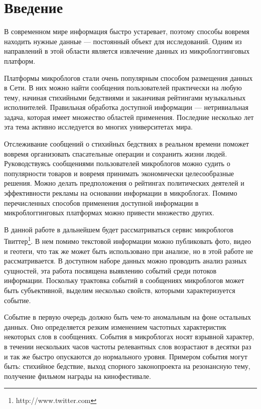 \documentclass[12pt, a4paper]{article}
\begin{document}
\tableofcontents\newpage

  \section{Введение}
  	В современном мире информация быстро устаревает, поэтому способы вовремя находить нужные данные --- постоянный объект для исследований. Одним из направлений в этой области является извлечение данных из микроблоггинговых платформ.
  	
  	Платформы микроблогов стали очень популярным способом размещения данных в Сети. В них можно найти сообщения пользователей практически на любую тему, начиная стихийными бедствиями и заканчивая рейтингами музыкальных исполнителей. Правильная обработка доступной информации --- нетривиальная задача, которая имеет множество областей применения. Последние несколько лет эта тема активно исследуется во многих университетах мира.
  	
	Отслеживание сообщений о стихийных бедствиях в реальном времени поможет вовремя организовать спасательные операции и сохранить жизни людей\cite{nuggets}. Руководствуясь сообщениями пользователей микроблогов можно судить о популярности товаров и вовремя принимать экономически целесообразные решения. Можно делать предположения о рейтингах политических деятелей и эффективности рекламы на основании информации в микроблогах. Помимо перечисленных способов применения доступной информации в микроблоггинговых платформах можно привести множество других.
	
	В данной работе в дальнейшем будет рассматриваться сервис микроблогов Твиттер\footnote{http://www.twitter.com}. В нем помимо текстовой информации можно публиковать фото, видео и геотеги, что так же может быть использовано при анализе, но в этой работе не рассматривается. В доступном наборе данных можно проводить анализ разных сущностей, эта работа посвящена выявлению событий среди потоков информации. Поскольку трактовка событий в сообщениях микроблогов может быть субъективной, выделим несколько свойств, которыми характеризуется событие.
	
	Событие в первую очередь должно быть чем-то аномальным на фоне остальных данных. Оно определяется резким изменением частотных характеристик некоторых слов в сообщениях. События в микроблогах носят взрывной характер, в течении нескольких часов частоты релевантных слов возрастают в десятки раз и так же быстро опускаются до нормального уровня. Примером события могут быть: стихийное бедствие, выход спорного законопроекта на резонансную тему, получение фильмом награды на кинофестивале.
	
\end{document}
